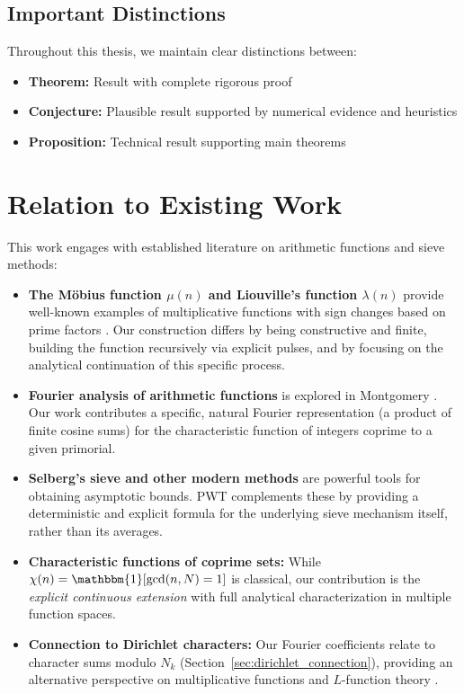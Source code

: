 ﻿\documentclass[12pt,a4paper]{report}
\theoremstyle{plain}
\theoremstyle{definition}
\renewcommand{\gcd}{\text{gcd}}
\begin{document}
\subsection*{Important Distinctions}

Throughout this thesis, we maintain clear distinctions between:
\begin{itemize}
    \item \textbf{Theorem:} Result with complete rigorous proof
    \item \textbf{Conjecture:} Plausible result supported by numerical evidence and heuristics
    \item \textbf{Proposition:} Technical result supporting main theorems
\end{itemize}

\section{Relation to Existing Work}

This work engages with established literature on arithmetic functions and sieve methods:

\begin{itemize}
    \item \textbf{The M\"obius function $\mu(n)$ and Liouville's function $\lambda(n)$} provide well-known examples of multiplicative functions with sign changes based on prime factors \cite{Hardy2008}. Our construction differs by being constructive and finite, building the function recursively via explicit pulses, and by focusing on the analytical continuation of this specific process.
    
    \item \textbf{Fourier analysis of arithmetic functions} is explored in Montgomery \cite{Montgomery1971}. Our work contributes a specific, natural Fourier representation (a product of finite cosine sums) for the characteristic function of integers coprime to a given primorial.
    
    \item \textbf{Selberg's sieve and other modern methods} \cite{Iwaniec2004, Bombieri1974} are powerful tools for obtaining asymptotic bounds. PWT complements these by providing a deterministic and explicit formula for the underlying sieve mechanism itself, rather than its averages.
    
    \item \textbf{Characteristic functions of coprime sets:} While $\chi(n) = \mathbbm{1}[\gcd(n,N)=1]$ is classical, our contribution is the \emph{explicit continuous extension} with full analytical characterization in multiple function spaces.
    
    \item \textbf{Connection to Dirichlet characters:} Our Fourier coefficients relate to character sums modulo $N_k$ (Section~\ref{sec:dirichlet_connection}), providing an alternative perspective on multiplicative functions and $L$-function theory \cite{Davenport1980}.
\end{itemize}
\end{document}
